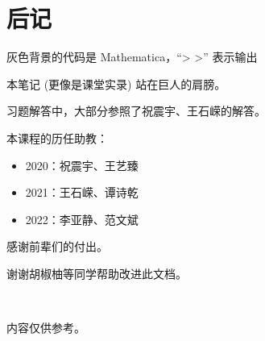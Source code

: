 \section{后记}

灰色背景的代码是 Mathematica，``> >'' 表示输出

本笔记 (更像是课堂实录) 站在巨人的肩膀。

习题解答中，大部分参照了祝震宇、王石嵘的解答。

本课程的历任助教：
\begin{itemize}
    \item 2020：祝震宇、王艺臻
    \item 2021：王石嵘、谭诗乾
    \item 2022：李亚静、范文斌
\end{itemize}

感谢前辈们的付出。

谢谢胡椒柚等同学帮助改进此文档。

~

内容仅供参考。

